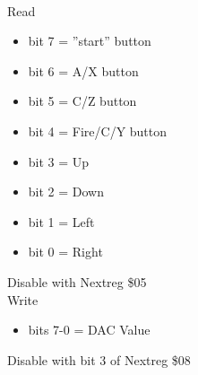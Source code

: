 \\
Read
\begin{itemize}
\item[] bit 7 = ''start'' button
\item[] bit 6 = A/X button
\item[] bit 5 = C/Z button
\item[] bit 4 = Fire/C/Y button
\item[] bit 3 = Up
\item[] bit 2 = Down
\item[] bit 1 = Left
\item[] bit 0 = Right
\end{itemize}
Disable with Nextreg \$05\\
Write
\begin{itemize}
\item[] bits 7-0 = DAC Value
\end{itemize}
Disable with bit 3 of Nextreg \$08
